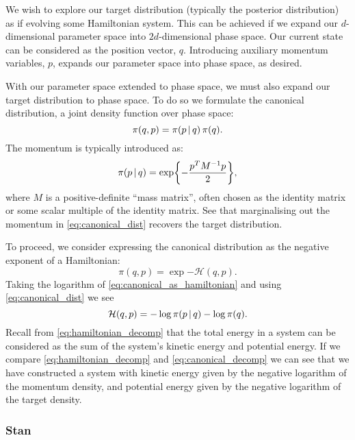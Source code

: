 We wish to explore our target distribution (typically the posterior distribution) as if
evolving some Hamiltonian system. This can be achieved if we expand our $d$-dimensional
parameter space into $2d$-dimensional phase space. Our current state can be considered as
the position vector, $q$. Introducing auxiliary momentum variables, $p$, expands
our parameter space into phase space, as desired.

With our parameter space extended to phase space, we must also expand our target
distribution to phase space. To do so we formulate the canonical distribution, a joint
density function over phase space:
\begin{equation}
    \label{eq:canonical_dist}
    \pi(q, p) = \pi(p \,|\, q) \, \pi(q).
\end{equation}
The momentum is typically introduced as:
\begin{equation}
    \pi(p \,|\, q) = \exp{-\frac{p^T M^{-1} p}{2}},
\end{equation}
where $M$ is a positive-definite ``mass matrix'', often chosen as the identity matrix or
some scalar multiple of the identity matrix. See that marginalising out the momentum in
\cref{eq:canonical_dist} recovers the target distribution.

To proceed, we consider expressing the canonical distribution as the
negative exponent of a Hamiltonian:
\begin{equation}
    \label{eq:canonical_as_hamiltonian}
    \pi(q, p) = \exp{-\mathcal{H}(q,p)}.
\end{equation}
Taking the logarithm of \cref{eq:canonical_as_hamiltonian} and using \cref{eq:canonical_dist}
we see
\begin{equation}
    \label{eq:canonical_decomp}
    \mathcal{H}(q, p) = -\log{\pi(p \,|\,q)} - \log{\pi(q)}.
\end{equation}
Recall from \cref{eq:hamiltonian_decomp} that the total energy in a system can be
considered as the sum of the system's kinetic energy and potential energy.  If we compare
\cref{eq:hamiltonian_decomp} and \cref{eq:canonical_decomp} we can see that we have
constructed a system with kinetic energy given by the negative logarithm of the momentum
density, and potential energy given by the negative logarithm of the target density.

\subsubsection{Stan}

